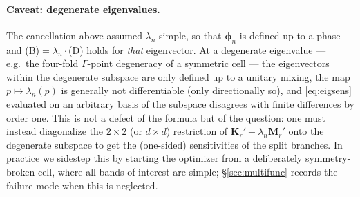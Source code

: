\documentclass[11pt]{article}
\begin{document}
\paragraph{Caveat: degenerate eigenvalues.} The cancellation above assumed
$\lambda_n$ simple, so that $\bm\phi_n$ is defined up to a phase and (B)$=\lambda_n
\cdot$(D) holds for \emph{that} eigenvector. At a degenerate eigenvalue --- e.g.\
the four-fold $\Gamma$-point degeneracy of a symmetric cell --- the eigenvectors
within the degenerate subspace are only defined up to a unitary mixing, the map
$p\mapsto\lambda_n(p)$ is generally not differentiable (only directionally so),
and \eqref{eq:eigsens} evaluated on an arbitrary basis of the subspace disagrees
with finite differences by order one. This is not a defect of the formula but of
the question: one must instead diagonalize the $2\times2$ (or $d\times d$)
restriction of $\mathbf K_r'-\lambda_n\mathbf M_r'$ onto the degenerate subspace
to get the (one-sided) sensitivities of the split branches. In practice we sidestep
this by starting the optimizer from a deliberately symmetry-broken cell, where all
bands of interest are simple; \S\ref{sec:multifunc} records the failure mode when
this is neglected.
\end{document}

